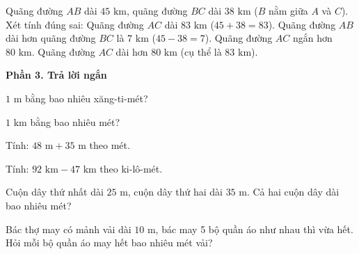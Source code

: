 \begin{ex} %
Quãng đường $AB$ dài $45\text{ km}$, quãng đường $BC$ dài $38\text{ km}$ ($B$ nằm giữa $A$ và $C$). Xét tính đúng sai:
\choiceTF
{\True Quãng đường $AC$ dài $83\text{ km}$ ($45 + 38 = 83$).}
{\True Quãng đường $AB$ dài hơn quãng đường $BC$ là $7\text{ km}$ ($45 - 38 = 7$).}
{Quãng đường $AC$ ngắn hơn $80\text{ km}$.}
{\True Quãng đường $AC$ dài hơn $80\text{ km}$ (cụ thể là $83\text{ km}$).}
\end{ex}

\textbf{Phần 3. Trả lời ngắn}

\begin{ex} %
$1\text{ m}$ bằng bao nhiêu xăng-ti-mét?
\end{ex}

\begin{ex} %
$1\text{ km}$ bằng bao nhiêu mét?
\end{ex}

\begin{ex} %
Tính: $48\text{ m} + 35\text{ m}$ theo mét.
\end{ex}

\begin{ex} %
Tính: $92\text{ km} - 47\text{ km}$ theo ki-lô-mét.
\end{ex}

\begin{ex} %
Cuộn dây thứ nhất dài $25\text{ m}$, cuộn dây thứ hai dài $35\text{ m}$. Cả hai cuộn dây dài bao nhiêu mét?
\end{ex}

\begin{ex} %
Bác thợ may có mảnh vải dài $10\text{ m}$, bác may 5 bộ quần áo như nhau thì vừa hết. Hỏi mỗi bộ quần áo may hết bao nhiêu mét vải?
\end{ex}
